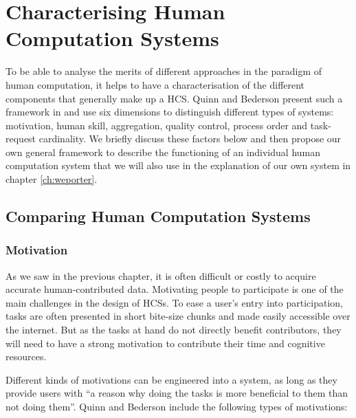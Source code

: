 

\section{Characterising Human Computation Systems} %
\label{sec:characterising_hcs}

To be able to analyse the merits of different approaches in the paradigm of human computation, it helps to have a characterisation of the different components that generally make up a HCS. Quinn and Bederson present such a framework in \cite{Quinn:2011us} and use six dimensions to distinguish different types of systems: motivation, human skill, aggregation, quality control, process order and task-request cardinality. We briefly discuss these factors below and then propose our own general framework to describe the functioning of an individual human computation system that we will also use in the explanation of our own system in chapter \ref{ch:weporter}.

\subsection{Comparing Human Computation Systems} %
\label{sub:comparing_systems}

\subsubsection{Motivation}
As we saw in the previous chapter, it is often difficult or costly to acquire accurate human-contributed data. Motivating people to participate is one of the main challenges in the design of HCSs. To ease a user's entry into participation, tasks are often presented in short bite-size chunks and made easily accessible over the internet. But as the tasks at hand do not directly benefit contributors, they will need to have a strong motivation to contribute their time and cognitive resources.

Different kinds of motivations can be engineered into a system, as long as they provide users with ``a reason why doing the tasks is more beneficial to them than not doing them''\cite{Quinn:2011us}. Quinn and Bederson include the following types of motivations: 

